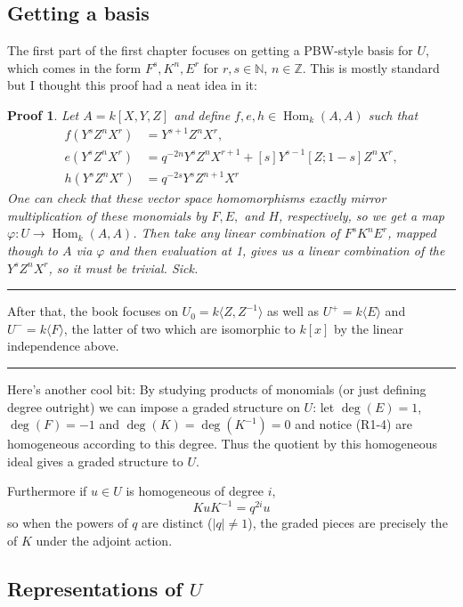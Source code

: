 \documentclass[12pt]{article}
\theoremstyle{nonumberbreak}
\theoremstyle{changebreak}
\theoremstyle{nonumberplain}
\newtheorem{prf}{Proof}
\theoremstyle{change}
\newcommand*{\bbZ}{\mathbb{Z}}
\newcommand*{\bbN}{\mathbb{N}}
\DeclareMathOperator{\Hom}{Hom}
\newcommand*{\brk}{
\rule{2in}{.1pt}
}
\begin{document}
\subsection{Getting a basis}
The first part of the first chapter focuses on getting a PBW-style basis for $U$, which comes in the form $F^s,K^n,E^r$ for $r,s\in\bbN$, $n\in\bbZ$.
This is mostly standard but I thought this proof had a neat idea in it:

\begin{prf}
	Let $A=k[X,Y,Z]$ and define $f,e,h\in \Hom_k(A,A)$ such that 
	\begin{align*}
		f(Y^sZ^nX^r)&=Y^{s+1}Z^nX^r,\\
		e(Y^sZ^nX^r)&=q^{-2n}Y^sZ^nX^{r+1}+[s]Y^{s-1}[Z;1-s]Z^n X^r,\\
		h(Y^sZ^nX^r)&=q^{-2s}Y^sZ^{n+1}X^r
	\end{align*}
	One can check that these vector space homomorphisms exactly mirror multiplication of these monomials
	by $F, E,$ and $H$, respectively, so we get a map $\varphi:U\to\Hom_k(A,A)$. Then take any linear combination of 
	$F^sK^nE^r$, mapped though to $A$ via $\varphi$ and then evaluation at 1, gives us a linear combination of the $Y^sZ^nX^r$,
	so it must be trivial. Sick.
\end{prf}

\brk

After that, the book focuses on $U_0=k\langle Z,Z^{-1}\rangle$ as well as $U^+=k\langle E\rangle$ and $U^-=k\langle F\rangle$,
the latter of two which are isomorphic to $k[x]$ by the linear independence above.

\brk

Here's another cool bit: By studying products of monomials (or just defining degree outright) we can impose a graded structure on $U$:
let $\deg(E)=1$, $\deg(F)=-1$ and $\deg(K)=\deg(K^{-1})=0$ and notice (R1-4) are homogeneous according to this degree.
Thus the quotient by this homogeneous ideal gives a graded structure to $U$.

Furthermore if $u\in U$ is homogeneous of degree $i$, 
\[KuK^{-1}=q^{2i}u\]
so when the powers of $q$ are distinct ($|q|\ne 1$), the graded pieces are precisely the 
 of $K$ under the adjoint action.

\subsection{Representations of $U$}

\end{document}
